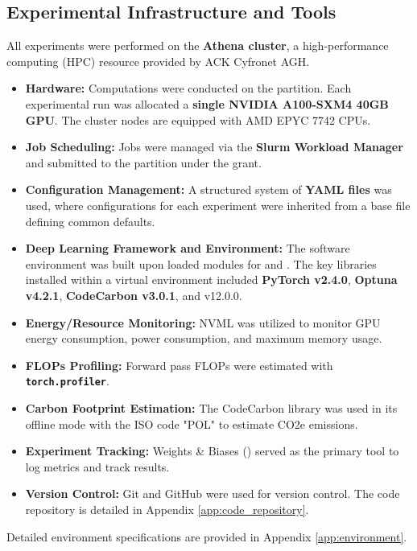 \subsection{Experimental Infrastructure and Tools}
\label{sec:methodology_infrastructure}
All experiments were performed on the \textbf{Athena cluster}, a high-performance computing (HPC) resource provided by ACK Cyfronet AGH.
\begin{itemize}
    \item \textbf{Hardware:} Computations were conducted on the  partition. Each experimental run was allocated a \textbf{single NVIDIA A100-SXM4 40GB GPU}. The cluster nodes are equipped with AMD EPYC 7742 CPUs.
    \item \textbf{Job Scheduling:} Jobs were managed via the \textbf{Slurm Workload Manager} and submitted to the  partition under the  grant.
    \item \textbf{Configuration Management:} A structured system of \textbf{YAML files} was used, where configurations for each experiment were inherited from a base file defining common defaults.
    \item \textbf{Deep Learning Framework and Environment:} The software environment was built upon loaded modules for \textbf{} and \textbf{}. The key libraries installed within a virtual environment included \textbf{PyTorch v2.4.0}, \textbf{Optuna v4.2.1}, \textbf{CodeCarbon v3.0.1}, and  v12.0.0.
    \item \textbf{Energy/Resource Monitoring:} NVML was utilized to monitor GPU energy consumption, power consumption, and maximum memory usage.
    \item \textbf{FLOPs Profiling:} Forward pass FLOPs were estimated with \textbf{\texttt{torch.profiler}}.
    \item \textbf{Carbon Footprint Estimation:} The CodeCarbon library was used in its offline mode with the ISO code "POL" to estimate CO2e emissions.
    \item \textbf{Experiment Tracking:} Weights \& Biases () served as the primary tool to log metrics and track results.
    \item \textbf{Version Control:} Git and GitHub were used for version control. The code repository is detailed in Appendix \ref{app:code_repository}.
\end{itemize}
Detailed environment specifications are provided in Appendix \ref{app:environment}.
